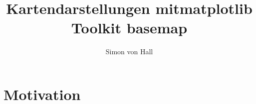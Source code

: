 \documentclass[a4paper,10pt]{article}
\title{Kartendarstellungen mit\newline matplotlib Toolkit basemap}
\author{Simon von Hall}
\begin{document}
\maketitle
\clearpage
\tableofcontents
\clearpage
\section{Motivation}
\label{sec:1}
\newpage
\newpage
\newpage
\newpage
\newpage
\end{document}
